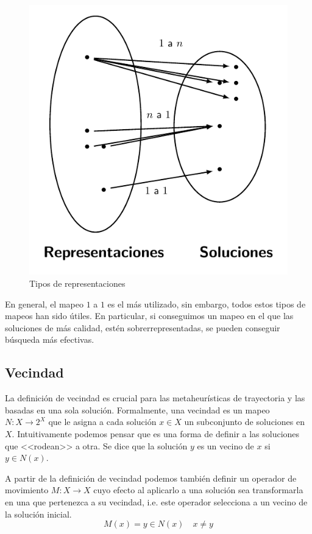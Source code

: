 \begin{figure}[H]
    \centering
    \includegraphics[scale=1]{Imagenes/representacion.pdf}
    \caption{Tipos de representaciones}
    \label{fig:reptypes}
\end{figure}

En general, el mapeo $1$ a $1$ es el más utilizado, sin embargo, todos estos tipos de mapeos han sido útiles.
%
En particular, si conseguimos un mapeo en el que las soluciones de más calidad, estén sobrerrepresentadas, se pueden conseguir búsqueda más efectivas.

\subsection{Vecindad}
La definición de vecindad es crucial para las metaheurísticas de trayectoria y las basadas en una sola solución.
%
Formalmente, una vecindad es un mapeo $N:X\rightarrow 2^X$ que le asigna a cada solución $x\in X$ un subconjunto de soluciones en $X$. 
%
Intuitivamente podemos pensar que es una forma de definir a las soluciones que <<rodean>> a otra. 
%
Se dice que la solución $y$ es un vecino de $x$ si $y\in N(x)$.

A partir de la definición de vecindad podemos también definir un operador de movimiento $M:X\rightarrow X$ cuyo efecto al aplicarlo a una solución sea 
transformarla en una que pertenezca a su vecindad, i.e. este operador selecciona a un vecino de la solución inicial.  
\[M(x)=y\in N(x)\quad x\neq y\]


